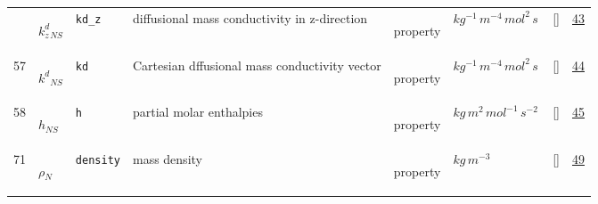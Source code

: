 \begin{longtable}{|p{1cm}|p{3cm}|p{3cm}|p{7cm}|p{3.0cm}|p{3cm}|p{2cm}|p{1cm}|}
             & \hypertarget{"v:56"}{ $ {k^d_z}{_{{N S}}} $}
             & \verb|kd_z|
             & diffusional mass conductivity in z-direction
             & \begin{lay}property \end{lay}
             & $ kg^{-1} \,m^{-4} \,mol^{2} \,s \, $
             & []
             & \hyperlink{"e:43"}{ 43 }
                 \\
    57
             & \hypertarget{"v:57"}{ $ {k^d}{_{{N S}}} $}
             & \verb|kd|
             & Cartesian dffusional mass conductivity vector
             & \begin{lay}property \end{lay}
             & $ kg^{-1} \,m^{-4} \,mol^{2} \,s \, $
             & []
             & \hyperlink{"e:44"}{ 44 }
                 \\
    58
             & \hypertarget{"v:58"}{ $ {h}{_{{N S}}} $}
             & \verb|h|
             & partial molar enthalpies
             & \begin{lay}property \end{lay}
             & $ kg \,m^{2} \,mol^{-1} \,s^{-2} \, $
             & []
             & \hyperlink{"e:45"}{ 45 }
                 \\
    71
             & \hypertarget{"v:71"}{ $ {\rho}{_{N}} $}
             & \verb|density|
             & mass density
             & \begin{lay}property \end{lay}
             & $ kg \,m^{-3} \, $
             & []
             & \hyperlink{"e:49"}{ 49 }
                 \\
    \end{longtable}